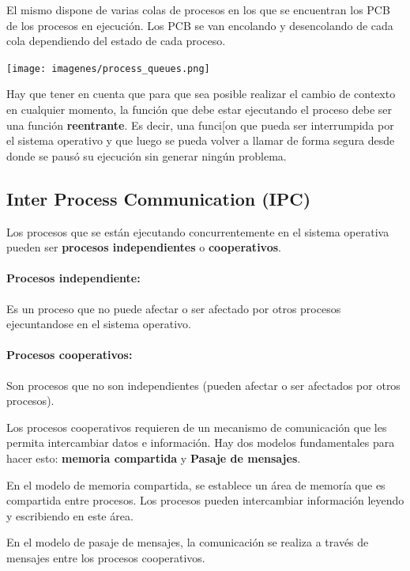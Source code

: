 El mismo dispone de varias colas de procesos en los que se encuentran los PCB de los procesos en ejecución. Los PCB se van encolando y desencolando de cada cola dependiendo del estado de cada proceso.

\vspace*{0.5cm}
\begin{center}
    \texttt{[image: imagenes/process\_queues.png]}
\end{center}

Hay que tener en cuenta que para que sea posible realizar el cambio de contexto en cualquier momento, la función que debe estar ejecutando el proceso debe ser una función \textbf{reentrante}. Es decir, una funci[on que pueda ser interrumpida por el sistema operativo y que luego se pueda volver a llamar de forma segura desde donde se pausó su ejecución sin generar ningún problema. 

\subsection{Inter Process Communication (IPC)}
Los procesos que se están ejecutando concurrentemente en el sistema operativa pueden ser \textbf{procesos independientes} o \textbf{cooperativos}.

\paragraph{Procesos independiente:} Es un proceso que no puede afectar o ser afectado por otros procesos ejecuntandose en el sistema operativo.

\paragraph{Procesos cooperativos:} Son procesos que no son independientes (pueden afectar o ser afectados por otros procesos).

Los procesos cooperativos requieren de un mecanismo de comunicación que les permita intercambiar datos e información. Hay dos modelos fundamentales para hacer esto: \textbf{memoria compartida} y \textbf{Pasaje de mensajes}.

En el modelo de memoria compartida, se establece un área de memoría que es compartida entre procesos. Los procesos pueden intercambiar información leyendo y escribiendo en este área.

En el modelo de pasaje de mensajes, la comunicación se realiza a través de mensajes entre los procesos cooperativos.

